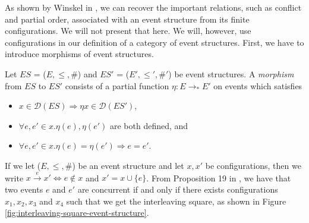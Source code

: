 As shown by Winskel in \cite[Proposition 18]{winskel95modelsCategory}, we can recover the important relations, such as conflict and partial order, associated with an event structure from its finite configurations. We will not present that here. We will, however, use configurations in our definition of a category of event structures. First, we have to introduce morphisms of event structures.

 \begin{definition}\label{def:morphisms-event-structure}
    Let $ES$ = ($E, \leq, \#$) and $ES'$ = ($E', \leq', \#'$) be event structures. A \emph{morphism} from $ES$ to $ES'$ consists of a partial function $\eta : E \rightarrow_{*} E'$ on events which satisfies
    
    \begin{itemize}
        \item $x \in \mathcal{D}(ES) \Rightarrow \eta x \in \mathcal{D}(ES')$,
        \item $\forall e, e' \in x . \eta (e), \eta (e')$ are both defined, and
        \item $\forall e, e' \in x . \eta (e) = \eta (e') \Rightarrow e = e'$.
    \end{itemize}
\end{definition}

If we let ($E, \leq, \#$) be an event structure and let $x, x'$ be configurations, then we write $x \xrightarrow{e} x' \Leftrightarrow e \notin x$ and $x' = x \cup \{e\}$. From Proposition 19 in \cite{winskel95modelsCategory}, we have that two events $e$ and $e'$ are concurrent if and only if there exists configurations $x_1, x_2, x_3$ and $x_4$ such that we get the interleaving square, as shown in Figure \ref{fig:interleaving-square-event-structure}.

